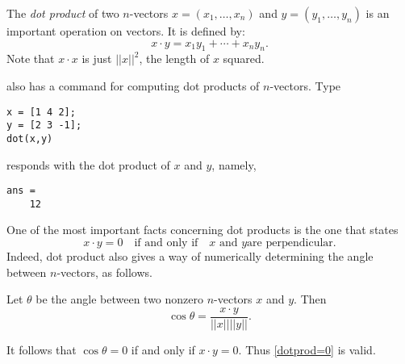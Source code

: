 \documentclass{ximera}
\begin{document}
The {\em dot product\/} of two $n$-vectors
$x=(x_1,\ldots,x_n)$ and $y=(y_1,\ldots,y_n)$ is an important
operation on vectors.  It is defined by:
\begin{equation}  \label{e:dotproduct}
x\cdot y = x_1y_1 + \cdots + x_ny_n.
\end{equation}
Note that $x\cdot x$ is just $||x||^2$, the length of $x$
squared.

\Matlab also has a command for computing dot products of
$n$-vectors.  Type
\begin{verbatim}
x = [1 4 2];
y = [2 3 -1];
dot(x,y)
\end{verbatim}
\Matlab responds with the dot product of $x$ and $y$, namely,
\begin{verbatim}
ans =
    12
\end{verbatim}

One of the most important facts concerning dot products is the
one that states
\begin{equation} \label{dotprod=0}
x\cdot y = 0 \quad \mbox{if and only if} \quad \mbox{$x$ and $y$
are perpendicular}.
\end{equation}  
Indeed, dot product also gives a way of numerically determining
the angle between $n$-vectors, as follows.
\begin{theorem} \label{T:dotangle}
Let $\theta$ be the angle between two nonzero $n$-vectors $x$
and $y$.  Then
\begin{equation}  \label{e:dotproductang}
\cos \theta = \frac{x\cdot y}{||x|| ||y||}.
\end{equation}
\end{theorem}
It follows that $\cos \theta=0$
if and only if $x\cdot y = 0$.  Thus \eqref{dotprod=0} is valid.
\end{document}
